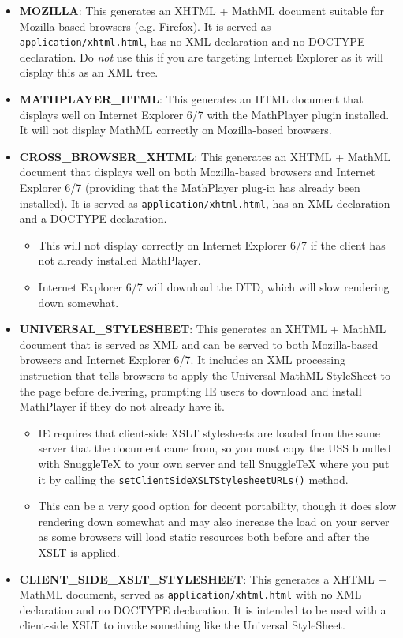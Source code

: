 \begin{itemize}
  \item \textbf{MOZILLA}: This generates an XHTML + MathML document suitable for
    Mozilla-based browsers (e.g. Firefox). It is served as \verb|application/xhtml.html|,
    has no XML declaration and no DOCTYPE declaration. Do \emph{not} use this if you
    are targeting Internet Explorer as it will display this as an XML tree.

  \item \textbf{MATHPLAYER\_HTML}: This generates an HTML document that displays well
    on Internet Explorer 6/7 with the MathPlayer plugin installed. It will not display
    MathML correctly on Mozilla-based browsers.

  \item \textbf{CROSS\_BROWSER\_XHTML}: This generates an XHTML + MathML document that
    displays well on both Mozilla-based browsers and Internet Explorer 6/7 (providing that
    the MathPlayer plug-in has already been installed). It is served as \verb|application/xhtml.html|,
    has an XML declaration and a DOCTYPE declaration.
    \begin{itemize}
      \item This will not display correctly on Internet Explorer 6/7 if the
        client has not already installed MathPlayer.
      \item Internet Explorer 6/7 will download the DTD, which will slow rendering down
        somewhat.
    \end{itemize}

  \item \textbf{UNIVERSAL\_STYLESHEET}: This generates an XHTML + MathML document
    that is served as XML and can be served to both Mozilla-based browsers and
    Internet Explorer 6/7. It includes an XML processing instruction that tells
    browsers to apply the Universal MathML StyleSheet to the page before delivering,
    prompting IE users to download and install MathPlayer if they do not already have it.
    \begin{itemize}
      \item IE requires that client-side XSLT stylesheets are loaded from the same server
        that the document came from, so you must copy the USS bundled with SnuggleTeX to
        your own server and tell SnuggleTeX where you put it by calling the
        \verb|setClientSideXSLTStylesheetURLs()| method.
      \item This can be a very good option for decent portability, though it does slow
        rendering down somewhat and may also increase the load on your server as some
        browsers will load static resources both before and after the XSLT is applied.
    \end{itemize}

  \item \textbf{CLIENT\_SIDE\_XSLT\_STYLESHEET}: This generates a XHTML + MathML document,
    served as \verb|application/xhtml.html| with no XML declaration and no DOCTYPE declaration.
    It is intended to be used with a client-side XSLT to invoke something like the
    Universal StyleSheet.

\end{itemize}

